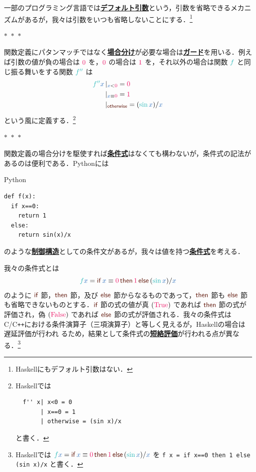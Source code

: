 \documentclass[a5paper,twoside,fleqn,draft]{jsbook}
\def\constantColor{WildStrawberry}
\def\keywordColor{Sepia}
\def\varColor{NavyBlue}
\def\funcColor{BlueGreen}
\newcommand{\separator}{\begin{center}$*$~$*$~$*$\end{center}}
\newcommand{\programminglanguage}[1]{\textsf{#1}}
\newcommand{\clang}{\programminglanguage{C}}
\newcommand{\cxx}{\programminglanguage{C}\texttt{++}}
\newcommand{\haskell}{\programminglanguage{Haskell}}
\newcommand{\python}{\programminglanguage{Python}}
\newcommand{\keyword}[1]{{\underline{\textbf{#1}}}}
\newcommand{\code}[1]{\texttt{#1}}
\newenvironment{pythoncode}{\begin{itembox}[r]{\python}}{\end{itembox}}
\newcommand{\mKeyword}[1]{\textcolor{\keywordColor}{\mathsf{#1}}}
\newcommand{\mIfKeyword}{\mKeyword{if}}
\newcommand{\mElseKeyword}{\mKeyword{else}}
\newcommand{\mOtherwiseKeyword}{\mKeyword{otherwise}}
\newcommand{\mThenKeyword}{\mKeyword{then}}
\DeclareMathOperator{\mElse}{\mElseKeyword}
\DeclareMathOperator{\mIf}{\mIfKeyword}
\DeclareMathOperator{\mOtherwise}{\mOtherwiseKeyword}
\DeclareMathOperator{\mThen}{\mThenKeyword}
\newcommand{\mConstant}[1]{\textcolor{\constantColor}{#1}}
\newcommand{\mSpecialConstant}[1]{\textcolor{\constantColor}{\textrm{#1}}}
\newcommand{\mZeroNumber}{{\mConstant{0}}}
\newcommand{\mOneNumber}{{\mConstant{1}}}
\newcommand{\mFalse}{\mSpecialConstant{False}}
\newcommand{\mTrue}{\mSpecialConstant{True}}
\newcommand{\mVar}[1]{\textcolor{\varColor}{#1}}
\newcommand{\mXVar}{\mVar{x}}
\newcommand{\mFunc}[1]{\textcolor{\funcColor}{#1}}
\newcommand{\mSpecialFunc}[1]{\textcolor{\funcColor}{\textrm{#1}}}
\newcommand{\mFFunc}{{\mFunc{f}}}
\newcommand{\mFFFFunc}{\mFunc{f''}}
\DeclareMathOperator{\mSin}{\mSpecialFunc{sin}}
\newcommand{\mGuard}[1]{\mathop{\mid_{#1}}}
\newcommand{\mIfThenElseEXP}[3]{\mIf{#1}\mThen{#2}\mElse{#3}} %
\begin{document}
一部のプログラミング言語では\keyword{デフォルト引数}という，引数を省略できるメカニズムがあるが，我々は引数をいつも省略しないことにする．\footnote{\haskell にもデフォルト引数はない．}

\separator

関数定義にパタンマッチではなく\keyword{場合分け}が必要な場合は\keyword{ガード}を用いる．例えば引数の値が負の場合は $\mZeroNumber$ を，$\mZeroNumber$ の場合は $\mOneNumber$ を，それ以外の場合は関数 $\mFFunc$ と同じ振る舞いをする関数 $\mFFFFunc$ は
\begin{equation}
  \begin{aligned}
    \mFFFFunc\mXVar&\mGuard{\mXVar<\mZeroNumber}=\mZeroNumber\\
    &\mGuard{\mXVar\equiv\mZeroNumber}=\mOneNumber\\
    &\mGuard{\mOtherwise}=(\mSin\mXVar)/\mXVar
  \end{aligned}
\end{equation}
という風に定義する．\footnote{\haskell では
\begin{verbatim}
  f'' x| x<0 = 0
       | x==0 = 1
       | otherwise = (sin x)/x
\end{verbatim}
と書く．}

\separator

関数定義の場合分けを駆使すれば\keyword{条件式}はなくても構わないが，条件式の記法があるのは便利である．\python には
\begin{pythoncode}
\begin{verbatim}
def f(x):
  if x==0:
    return 1
  else:
    return sin(x)/x
\end{verbatim}
\end{pythoncode}
のような\keyword{制御構造}としての条件文があるが，我々は値を持つ\keyword{条件式}を考える．

我々の条件式とは
\begin{equation}
  \mFFunc\mXVar
  =\mIf\mXVar\equiv\mZeroNumber
  \mThen\mOneNumber
  \mElse{}(\mSin\mXVar)/\mXVar
\end{equation}
のように $\mIf$ 節，$\mThen$ 節，及び $\mElse$ 節からなるものであって，$\mThen$ 節も $\mElse$ 節も省略できないものとする．$\mIf$ 節の式の値が真 $(\mTrue)$ であれば $\mThen$ 節の式が評価され，偽 $(\mFalse)$ であれば $\mElse$ 節の式が評価される．我々の条件式は\clang/\cxx における条件演算子（三項演算子）と等しく見えるが，\haskell の場合は遅延評価が行われ
るため，結果として条件式の\keyword{短絡評価}が行われる点が異なる．\footnote{\haskell では $\mFFunc\mXVar=\mIfThenElseEXP{\mXVar\equiv\mZeroNumber}{\mOneNumber}{(\mSin\mXVar)/\mXVar}$ を \code{f x = if x==0 then 1 else (sin x)/x} と書く．}
\end{document}
